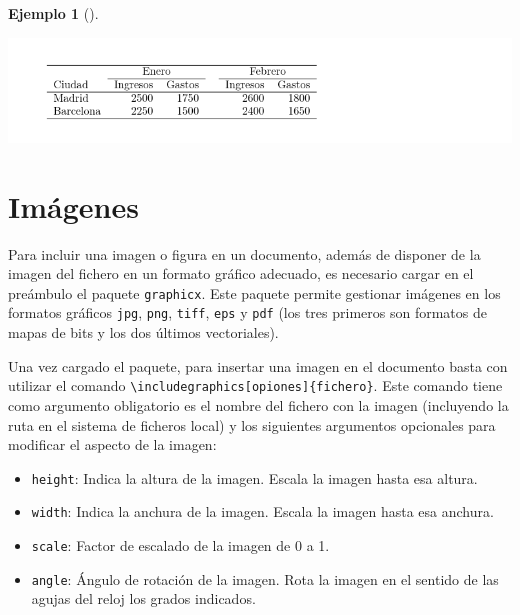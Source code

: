 \documentclass[
  a4paper,
]{scrreport}
\providecommand{\tightlist}{%
  \setlength{\itemsep}{0pt}\setlength{\parskip}{0pt}}\usepackage{longtable,booktabs,array}
\theoremstyle{definition}
\newtheorem{example}{Ejemplo}[chapter]
\theoremstyle{remark}
\begin{document}
\begin{example}[]
\begin{tcolorbox}[enhanced jigsaw, colframe=quarto-callout-note-color-frame, opacityback=0, title={Salida}, bottomrule=.15mm, left=2mm, coltitle=black, arc=.35mm, leftrule=.75mm, colback=white, rightrule=.15mm, colbacktitle=quarto-callout-note-color!10!white, toprule=.15mm, breakable, opacitybacktitle=0.6, bottomtitle=1mm, toptitle=1mm, titlerule=0mm]

\includegraphics{img/tablas/tabla-multicolumna.png}

\end{tcolorbox}

\end{example}


\chapter{Imágenes}\label{imuxe1genes}

Para incluir una imagen o figura en un documento, además de disponer de
la imagen del fichero en un formato gráfico adecuado, es necesario
cargar en el preámbulo el paquete \texttt{graphicx}. Este paquete
permite gestionar imágenes en los formatos gráficos \texttt{jpg},
\texttt{png}, \texttt{tiff}, \texttt{eps} y \texttt{pdf} (los tres
primeros son formatos de mapas de bits y los dos últimos vectoriales).

Una vez cargado el paquete, para insertar una imagen en el documento
basta con utilizar el comando
\texttt{\textbackslash{}includegraphics{[}opiones{]}\{fichero\}}. Este
comando tiene como argumento obligatorio es el nombre del fichero con la
imagen (incluyendo la ruta en el sistema de ficheros local) y los
siguientes argumentos opcionales para modificar el aspecto de la imagen:

\begin{itemize}
\tightlist
\item
  \texttt{height}: Indica la altura de la imagen. Escala la imagen hasta
  esa altura.
\item
  \texttt{width}: Indica la anchura de la imagen. Escala la imagen hasta
  esa anchura.
\item
  \texttt{scale}: Factor de escalado de la imagen de 0 a 1.
\item
  \texttt{angle}: Ángulo de rotación de la imagen. Rota la imagen en el
  sentido de las agujas del reloj los grados indicados.
\end{itemize}
\end{document}
